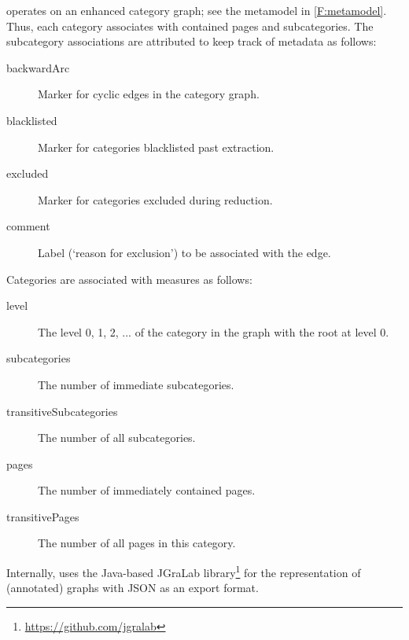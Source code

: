 
\WikiTax{} operates on an enhanced category graph; see the metamodel in \autoref{F:metamodel}. Thus, each category associates with contained pages and subcategories. The subcategory associations are attributed to keep track of metadata as follows: 

\vspace{-22\in}

{\small

\begin{description}
\item[backwardArc] Marker for cyclic edges in the category graph.
\item[blacklisted] Marker for categories blacklisted past extraction.
\item[excluded] Marker for categories excluded during reduction.
\item[comment] Label (`reason for exclusion') to be associated with the edge.
\end{description}

}

\vspace{-22\in}

\noindent
Categories are associated with measures as follows:

\vspace{-22\in}

{\small

\begin{description}
\item[level] The level 0, 1, 2, ... of the category in the graph with the root at level 0.
\item[subcategories] The number of immediate subcategories.
\item[transitiveSubcategories] The number of all subcategories.
\item[pages] The number of immediately contained pages.
\item[transitivePages] The number of all pages in this category.
\end{description}

}

\vspace{-22\in}

\noindent
Internally, \WikiTax{} uses the Java-based JGraLab
library\footnote{\url{https://github.com/jgralab}} for the
representation of (annotated) graphs with JSON as an export
format.

